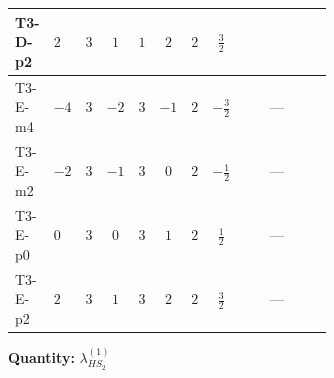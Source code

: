 \documentclass[8pt]{article}
\begin{document}
\begin{landscape}
\begin{longtable}{@{}llcccccc >{\raggedright\arraybackslash}p{0.21\linewidth} >{\raggedright\arraybackslash}p{0.21\linewidth} >{\raggedright\arraybackslash}p{0.21\linewidth}@{}}
T3-D-p2 & $2$ & $3$ & $1$ & $1$ & $2$ & $2$ & $\frac{3}{2}$ & \scriptsize\adjustbox{max width=\linewidth}{$\begin{gathered} -\frac{51 {g_1}^2 {\lambda_{HS_2}^{(1)}}}{2}\end{gathered}$} & \scriptsize\adjustbox{max width=\linewidth}{$\begin{gathered} +6 {\lambda_{12}^{(1)}} {\lambda_{HS_1}^{(1)}}\end{gathered}$} & \scriptsize\adjustbox{max width=\linewidth}{$\begin{gathered} +6 {\lambda_1} {\lambda_{HS_2}^{(1)}}\end{gathered}$} \\
\midrule
T3-E-m4 & $-4$ & $3$ & $-2$ & $3$ & $-1$ & $2$ & $-\frac{3}{2}$ & \scriptsize\adjustbox{max width=\linewidth}{$\begin{gathered} -\frac{15 {g_1}^2 {\lambda_{HS_2}^{(1)}}}{2}\end{gathered}$} & --- & \scriptsize\adjustbox{max width=\linewidth}{$\begin{gathered} +6 {\lambda_1} {\lambda_{HS_2}^{(1)}}\end{gathered}$} \\
\midrule
T3-E-m2 & $-2$ & $3$ & $-1$ & $3$ & $0$ & $2$ & $-\frac{1}{2}$ & \scriptsize\adjustbox{max width=\linewidth}{$\begin{gathered} -\frac{3 {g_1}^2 {\lambda_{HS_2}^{(1)}}}{2}\end{gathered}$} & --- & \scriptsize\adjustbox{max width=\linewidth}{$\begin{gathered} +6 {\lambda_1} {\lambda_{HS_2}^{(1)}}\end{gathered}$} \\
\midrule
T3-E-p0 & $0$ & $3$ & $0$ & $3$ & $1$ & $2$ & $\frac{1}{2}$ & \scriptsize\adjustbox{max width=\linewidth}{$\begin{gathered} -\frac{15 {g_1}^2 {\lambda_{HS_2}^{(1)}}}{2}\end{gathered}$} & --- & \scriptsize\adjustbox{max width=\linewidth}{$\begin{gathered} +6 {\lambda_1} {\lambda_{HS_2}^{(1)}}\end{gathered}$} \\
\midrule
T3-E-p2 & $2$ & $3$ & $1$ & $3$ & $2$ & $2$ & $\frac{3}{2}$ & \scriptsize\adjustbox{max width=\linewidth}{$\begin{gathered} -\frac{51 {g_1}^2 {\lambda_{HS_2}^{(1)}}}{2}\end{gathered}$} & --- & \scriptsize\adjustbox{max width=\linewidth}{$\begin{gathered} +6 {\lambda_1} {\lambda_{HS_2}^{(1)}}\end{gathered}$} \\
\midrule
\bottomrule
\end{longtable}
\clearpage
\noindent\textbf{Quantity: }$\lambda_{HS_2}^{(1)}$\par\smallskip

\end{landscape}
\end{document}
